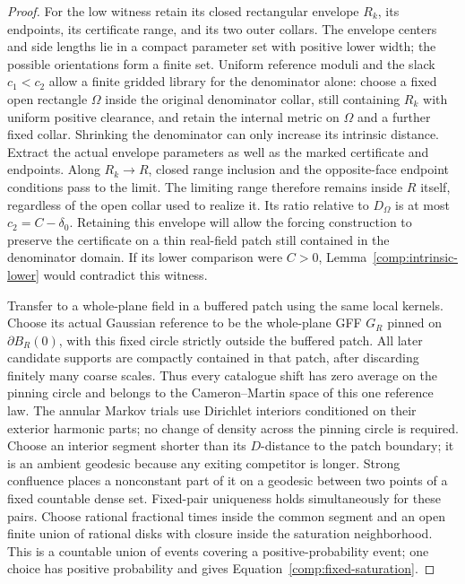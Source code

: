 \begin{proof}
For the low witness retain its closed rectangular envelope $R_k$,
its endpoints, its certificate range, and its two outer collars.
The envelope centers and side lengths lie in a compact parameter set
with positive lower width; the possible orientations form a finite
set.  Uniform reference moduli and the slack $c_1<c_2$ allow a finite
gridded library for the denominator alone: choose a fixed open
rectangle $\Omega$ inside the original denominator collar, still
containing $R_k$ with uniform positive clearance, and retain the
internal metric on $\Omega$ and a further fixed collar.
Shrinking the denominator can only increase its intrinsic distance.
Extract the actual envelope parameters as well as the marked
certificate and endpoints.  Along $R_k\to R$, closed range inclusion
and the opposite-face endpoint conditions pass to the limit.
The limiting range therefore remains inside $R$ itself, regardless
of the open collar used to realize it.  Its ratio relative to
$D_\Omega$ is at most $c_2=C-\delta_0$.  Retaining this envelope
will allow the forcing construction to preserve the certificate on a
thin real-field patch still contained in the denominator domain.
If its lower comparison were $C>0$,
Lemma~\ref{comp:intrinsic-lower} would contradict this witness.

Transfer to a whole-plane field in a buffered patch using the same
local kernels.  Choose its actual Gaussian reference to be the
whole-plane GFF $G_R$ pinned on $\partial B_R(0)$, with this fixed
circle strictly outside the buffered patch.  All later candidate
supports are compactly contained in that patch, after discarding
finitely many coarse scales.  Thus every catalogue shift has zero
average on the pinning circle and belongs to the Cameron--Martin
space of this one reference law.  The annular Markov trials use
Dirichlet interiors conditioned on their exterior harmonic parts;
no change of density across the pinning circle is required.
Choose an interior segment shorter than its
$D$-distance to the patch boundary; it is an ambient geodesic because
any exiting competitor is longer.  Strong confluence places a
nonconstant part of it on a geodesic between two points of a fixed
countable dense set.  Fixed-pair uniqueness holds simultaneously for
these pairs.  Choose rational fractional times inside the common
segment and an open finite union of rational disks with closure inside
the saturation neighborhood.  This is a countable union of events
covering a positive-probability event; one choice has positive
probability and gives Equation~\eqref{comp:fixed-saturation}.
\end{proof}

